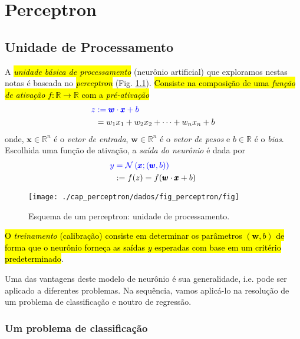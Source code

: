 

\chapter{Perceptron}\label{cap_perceptron}
\thispagestyle{fancy}


\section{Unidade de Processamento}\label{cap_perceptron_sec_unit}

A \hl{\emph{unidade básica de processamento}} (neurônio artificial) que exploramos nestas notas é baseada no \hl{\emph{perceptron}} (Fig. \ref{fig:perceptron}). \hl{Consiste na composição de uma \emph{função de ativação} $f:\mathbb{R}\to\mathbb{R}$ com a \emph{pré-ativação}}
\begin{align}
  \color{blue}z &\color{blue}:= \pmb{w}\cdot\pmb{x} + b \\
           &= w_1x_1 + w_2x_2 + \cdots + w_nx_n + b
\end{align}
onde, $\pmb{x}\in\mathbb{R}^{n}$ é o \emph{vetor de entrada}, $\pmb{w}\in\mathbb{R}^{n}$ é o \emph{vetor de pesos} e $b\in\mathbb{R}$ é o \emph{\textit{bias}}. Escolhida uma função de ativação, a \emph{saída do neurônio} é dada por
\begin{align}
  \color{blue}y &\color{blue}= \mathcal{N}\left(\pmb{x}; (\pmb{w},b)\right)\\
    &:= f(z) = f(\pmb{w}\cdot\pmb{x} + b)
\end{align}

\begin{figure}[H]
  \centering
  \texttt{[image: ./cap\_perceptron/dados/fig\_perceptron/fig]}
  \caption{Esquema de um perceptron: unidade de processamento.}
  \label{fig:perceptron}
\end{figure}

\hl{O \emph{treinamento} (calibração) consiste em determinar os parâmetros $(\pmb{w}, b)$ de forma que o neurônio forneça as saídas $y$ esperadas com base em um critério predeterminado}.

Uma das vantagens deste modelo de neurônio é sua generalidade, i.e. pode ser aplicado a diferentes problemas. Na sequência, vamos aplicá-lo na resolução de um problema de classificação e noutro de regressão.


\subsection{Um problema de classificação}\label{cap_perceptron_ssec_classic}

